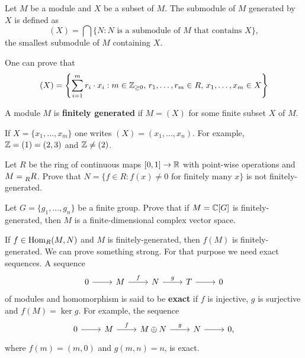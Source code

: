 \chapter{}


\begin{definition}
Let $M$ be a module and $X$ be a subset of $M$. The submodule
of $M$ generated by $X$ is defined as
\[
(X)=\bigcap\{N:N\text{ is a submodule of $M$ that contains $X$}\},
\]
the smallest submodule of $M$ containing $X$. 
\end{definition}

One can prove that  
\[
(X)=\left\{\sum_{i=1}^mr_i\cdot x_i:m\in\mathbb{Z}_{\geq0},\,r_1,\dots,r_m\in R,\,x_1,\dots,x_m\in X\right\}
\]

\begin{definition}
    A module $M$ is \textbf{finitely generated} if $M=(X)$ for some finite subset $X$ of $M$.
\end{definition}

If $X=\{x_1,\dots,x_m\}$ one writes $(X)=(x_1,\dots,x_n)$.
For example, $\mathbb{Z}=(1)=(2,3)$ and $\mathbb{Z}\ne (2)$.

\begin{exercise}
    Let $R$ be the ring of continuous maps $[0,1]\to\mathbb{R}$ with point-wise operations and 
    $M=\prescript{}{R}{R}$. Prove that
    $N=\{f\in R:f(x)\ne0\text{ for finitely many $x$}\}$ is not finitely-generated. 
\end{exercise}

\begin{exercise}
    Let $G=\{g_1,\dots,g_n\}$ be a finite group. Prove that if $M=\mathbb{C}[G]$ is finitely-generated, then
    $M$ is a finite-dimensional complex vector space. 
\end{exercise}

If $f\in\operatorname{Hom}_R(M,N)$ and $M$ is finitely-generated, then 
$f(M)$ is finitely-generated. We can prove something strong. For that purpose
we need exact sequences. 
A sequence 
	\begin{equation}
	\label{eq:exacta1}	
    \begin{tikzcd}
	0 & M & N & T & 0
	\arrow[from=1-1, to=1-2]
	\arrow["f", from=1-2, to=1-3]
	\arrow["g", from=1-3, to=1-4]
	\arrow[from=1-4, to=1-5]
    \end{tikzcd}
  	\end{equation}
of modules and homomorphism is said to be \textbf{exact} 
if $f$ is injective, $g$ is surjective and $f(M)=\ker g$. For example,
the sequence
\[
\begin{tikzcd}
	0 & M & M\oplus N & N & 0,
	\arrow[from=1-1, to=1-2]
	\arrow["f", from=1-2, to=1-3]
	\arrow["g", from=1-3, to=1-4]
	\arrow[from=1-4, to=1-5]
\end{tikzcd}
\]
where $f(m)=(m,0)$ and $g(m,n)=n$, is exact.

